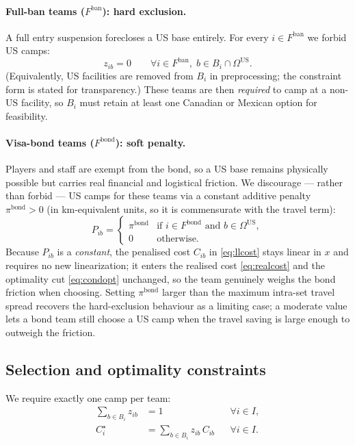 \documentclass[12pt, letterpaper]{article}
\begin{document}
\paragraph{Full-ban teams ($F^{\mathrm{ban}}$): hard exclusion.}
A full entry suspension forecloses a US base entirely. For every
$i\in F^{\mathrm{ban}}$ we forbid US camps:
\begin{equation}
z_{ib}=0 \qquad\forall i\in F^{\mathrm{ban}},\;
  b\in B_i\cap\Omega^{\mathrm{US}}.
\label{eq:banexcl}
\end{equation}
(Equivalently, US facilities are removed from $B_i$ in preprocessing; the
constraint form is stated for transparency.) These teams are then
\emph{required} to camp at a non-US facility, so $B_i$ must retain at
least one Canadian or Mexican option for feasibility.

\paragraph{Visa-bond teams ($F^{\mathrm{bond}}$): soft penalty.}
Players and staff are exempt from the bond, so a US base remains
physically possible but carries real financial and logistical friction.
We discourage --- rather than forbid --- US camps for these teams via a
constant additive penalty $\pi^{\mathrm{bond}}>0$ (in km-equivalent
units, so it is commensurate with the travel term):
\begin{equation}
P_{ib}=
  \begin{cases}
  \pi^{\mathrm{bond}} & \text{if } i\in F^{\mathrm{bond}}
    \text{ and } b\in\Omega^{\mathrm{US}},\\
  0 & \text{otherwise.}
  \end{cases}
\label{eq:bondpen}
\end{equation}
Because $P_{ib}$ is a \emph{constant}, the penalised cost $C_{ib}$ in
\eqref{eq:llcost} stays linear in $x$ and requires no new linearization;
it enters the realised cost \eqref{eq:realcost} and the optimality cut
\eqref{eq:condopt} unchanged, so the team genuinely weighs the bond
friction when choosing. Setting $\pi^{\mathrm{bond}}$ larger than the
maximum intra-set travel spread recovers the hard-exclusion behaviour as
a limiting case; a moderate value lets a bond team still choose a US camp
when the travel saving is large enough to outweigh the friction.

\subsection{Selection and optimality constraints}
We require exactly one camp per team:
\begin{align}
\sum_{b\in B_i} z_{ib} &= 1 &&\forall i\in I,\label{eq:selone}\\
C_i^\star &= \sum_{b\in B_i} z_{ib}\, C_{ib}
  &&\forall i\in I. \label{eq:realcost}
\end{align}
\end{document}
